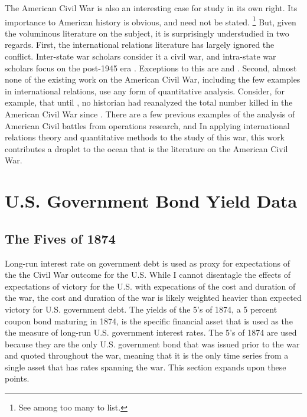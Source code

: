 The American Civil War is also an interesting case for study in its own right.
Its importance to American history is obvious, and need not be stated.%
\footnote{See \textcite{McPherson2003} among too many to list.}
But, given the voluminous literature on the subject, it is surprisingly understudied in two regards. %
First, the international relations literature has largely ignored the conflict.
Inter-state war scholars consider it a civil war, and intra-state war scholars focus on the post-1945 era \parencites[140-141]{Reiter2009}[2]{Poast2012}. %
Exceptions to this are \textcite{Reiter2009} and \textcite{Poast2012}.
Second, almost none of the existing work on the American Civil War, including the few examples in international relations, use any form of quantitative analysis.%
Consider, for example, that until \textcite{hacker2011census}, no historian had reanalyzed the total number killed in the American Civil War since \textcite{Livermore1900}.
There are a few previous examples of the analysis of American Civil battles from operations research, \textcite{Weiss1966} and
In applying international relations theory and quantitative methods to the study of this war, this work contributes a droplet to the ocean that is the literature on the American Civil War.




\section{U.S. Government Bond Yield Data}
\label{bonds_battles:sec:why-prices-study}



\subsection{The Fives of 1874}
\label{bonds_battles:sec:5s-1874}

Long-run interest rate on government debt is used as proxy for expectations of the the Civil War outcome for the U.S.
While I cannot disentagle the effects of expectations of victory for the U.S. with expecations of the cost and duration of the war, the cost and duration of the war is likely weighted heavier than expected victory for U.S. government debt.
The yields of the 5's of 1874, a 5 percent coupon bond maturing in 1874, is the specific financial asset that is used as the the measure of long-run U.S. government interest rates.
The 5's of 1874 are used because they are the only U.S. government bond that was issued prior to the war and quoted throughout the war, meaning that it is the only time series from a single asset that has rates spanning the war.
This section expands upon these points.

